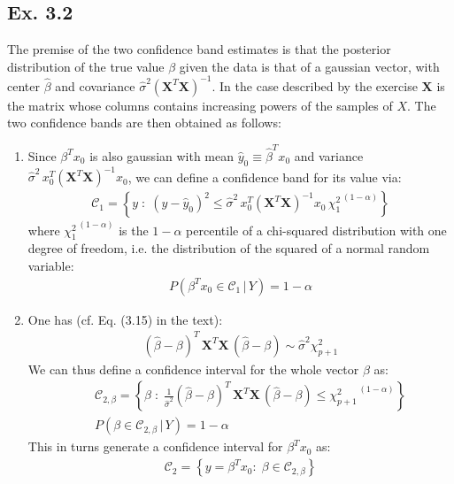 \subsection*{Ex. 3.2 \seecode}
The premise of the two confidence band estimates is that the posterior
distribution of the true value $\beta$ given the data is that of a gaussian vector, 
with center $\hat{\beta}$ and covariance $ \hat{\sigma}^2 \left( \mathbf{X} ^T \mathbf{X}  \right) ^{-1}$. In the case described by the exercise $\mathbf{X}$
is the matrix whose columns contains increasing powers of the samples of $X$.
The two confidence bands are then obtained as follows:
\begin{enumerate}
\item Since $\beta^T x_0$ is also gaussian with mean $\hat{y}_0 \equiv \hat{\beta}^T x_0$ and variance $\hat{\sigma}^2\, x_0^T ( \mathbf{X} ^T \mathbf{X})^{-1} x_0$, we can define a confidence band for its value via:
\begin{eqnarray*}
\mathcal{C}_1 =  \left\{ y \; : \; (y - \hat{y}_0)^2 \leq \hat{\sigma}^2 \, x_0^T ( \mathbf{X} ^T \mathbf{X})^{-1} x_0 \, {\chi_{1}^2} ^{\,(1- \alpha)} \right\}
\end{eqnarray*}
where ${\chi_{1}^2} ^{\,(1- \alpha)}$ is the $1 - \alpha$ percentile of a chi-squared distribution with one degree of freedom, i.e. the distribution of the squared of a normal random variable:
\begin{eqnarray*}
P(\beta^T x_0 \in \mathcal{C}_1 \, | \, Y) = 1 - \alpha
\end{eqnarray*}
\item One has (cf. Eq. (3.15) in the text):
\begin{eqnarray*}
( \hat{\beta} - \beta) ^T \, \mathbf{X}^T \mathbf{X} \, ( \hat{\beta} - \beta) \sim \hat{\sigma}^2 \chi_{p+1}^2
\end{eqnarray*}
We can thus define a confidence interval for the whole vector $\beta$ as:
\begin{eqnarray*}
&& \mathcal{C}_{2, \beta}  = \left\{ \beta \; : \;\frac{1}{\hat{\sigma}^2} ( \hat{\beta} - \beta) ^T \, \mathbf{X}^T \mathbf{X} \, ( \hat{\beta} - \beta) \leq  {\chi_{p + 1}^2} ^{\,(1- \alpha)} \right\} \\
&& P(\beta \in \mathcal{C}_{2, \beta} \, | \, Y)  =  1 - \alpha
\end{eqnarray*}
This in turns generate a confidence interval for $\beta^T x_0$ as:
\begin{eqnarray*}
\mathcal{C}_2 = \left\{ y = \beta^T x_0: \; \beta \in \mathcal{C}_{2, \beta} \right\}
\end{eqnarray*}
\end{enumerate}
